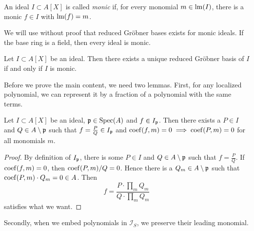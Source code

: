\begin{definition}
  An ideal $I \subset A[X]$ is called \textit{monic} if, for every monomial $m \in \operatorname{lm}(I)$, there is a monic $f \in I$ with $\operatorname{lm}(f) = m$.
\end{definition}

We will use without proof that reduced Gröbner bases exists for monic ideals. If the base ring is a field, then every ideal is monic.

\begin{proposition}\label{prop:exi!_red_grb}
  Let $I \subset A[X]$ be an ideal. Then there exists a unique reduced Gröbner basis of $I$ if and only if $I$ is monic.
\end{proposition}

Before we prove the main content, we need two lemmas. First, for any localized polynomial, we can represent it by a fraction of a polynomial with the same terms.

\begin{lemma}\label{lem:local_poly_rep}
  Let $I \subset A[X]$ be an ideal, $\mathfrak p \in \operatorname{Spec}(A)$ and $f \in I_{\mathfrak p}$. Then there exists a $P \in I$ and $Q \in A \setminus \mathfrak p$ such that $f = \frac P Q \in I_{\mathfrak p}$ and $\operatorname{coef}(f, m) = 0 \implies \operatorname{coef}(P, m) = 0$ for all monomials $m$.
\end{lemma}
\begin{proof}
  By definition of $I_{\mathfrak p}$, there is some $P \in I$ and $Q \in A \setminus \mathfrak p$ such that $f = \frac P Q$. If $\operatorname{coef}(f, m) = 0$, then $\operatorname{coef}(P, m)/Q = 0$. Hence there is a $Q_{m} \in A \setminus \mathfrak p$ such that $\operatorname{coef}(P, m)\cdot Q_{m} = 0 \in A$. Then
  \[f = \frac{P \cdot \prod_{m}Q_{m}}{Q \cdot \prod_{m}Q_{m}}\] satisfies what we want.
\end{proof}

Secondly, when we embed polynomials in $\mathcal I_{S}$, we preserve their leading monomial.

